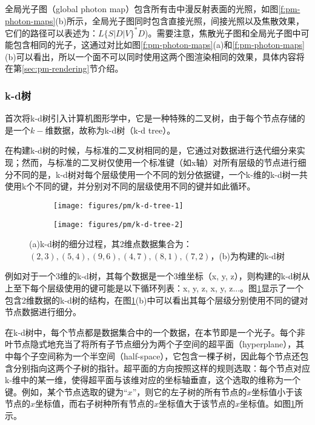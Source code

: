 全局光子图（global photon map）包含所有击中漫反射表面的光照，如图\ref{f:pm-photon-maps}(b)所示，全局光子图同时包含直接光照，间接光照以及焦散效果，它们的路径可以表述为：$L\{S|D|V\}^{*}D$)。需要注意，焦散光子图和全局光子图中可能包含相同的光子，这通过对比如图\ref{f:pm-photon-maps}(a)和\ref{f:pm-photon-maps}(b)可以看出，所以一个面不可以同时使用这两个图渲染相同的效果，具体内容将在第\ref{sec:pm-rendering}节介绍。





\subsubsection{k-d树}
\cite{a:MultidimensionalBinarySearchTreesUsedforAssociativeSearching}首次将k-d树引入计算机图形学中，它是一种特殊的二叉树，由于每个节点存储的是一个$k-$维数据，故称为k-d树（k-d tree）。

在构建k-d树的时候，与标准的二叉树相同的是，它通过对数据进行迭代细分来实现；然而，与标准的二叉树仅使用一个标准键（如x轴）对所有层级的节点进行细分不同的是，k-d树对每个层级使用一个不同的划分依据键，一个k-维的k-d树一共使用k个不同的键，并分别对不同的层级使用不同的键并如此循环。

\begin{figure}
\begin{center}
	\begin{subfigure}[b]{.49\textwidth}
		\texttt{[image: figures/pm/k-d-tree-1]}
		\caption{}
	\end{subfigure}
	\begin{subfigure}[b]{.49\textwidth}
		\texttt{[image: figures/pm/k-d-tree-2]}
		\caption{}
	\end{subfigure}
\end{center}
\caption{(a)k-d树的细分过程，其2维点数据集合为：$(2,3), (5,4), (9,6), (4,7), (8,1), (7,2)$，(b)为构建的k-d树}
\label{f:pm-photon-kd-tree}
\end{figure}

例如对于一个3维的k-d树，其每个数据是一个3维坐标（x, y, z），则构建的k-d树从上至下每个层级使用的键可能是以下循环列表：x, y, z, x, y, z...。图\ref{f:pm-photon-kd-tree}显示了一个包含2维数据的k-d树的结构，在图\ref{f:pm-photon-kd-tree}(b)中可以看出其每个层级分别使用不同的键对节点数据进行细分。

在k-d树中，每个节点都是数据集合中的一个数据，在本节即是一个光子。每个非叶节点隐式地充当了将所有子节点细分为两个子空间的超平面（hyperplane），其中每个子空间称为一个半空间（half-space），它包含一棵子树，因此每个节点还包含分别指向这两个子树的指针。超平面的方向按照这样的规则选取：每个节点对应k-维中的某一维，使得超平面与该维对应的坐标轴垂直，这个选取的维称为一个键。例如，某个节点选取的键为“$x$”，则它的左子树的所有节点的$x$坐标值小于该节点的$x$坐标值，而右子树种所有节点的$x$坐标值大于该节点的$x$坐标值。如图\ref{f:pm-photon-kd-tree}所示。

